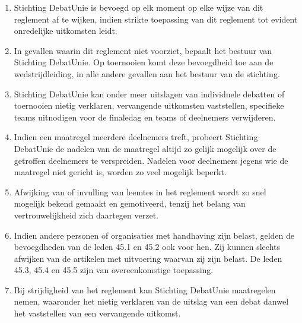 
\begin{enumerate}
\item Stichting DebatUnie is bevoegd op elk moment op elke wijze van dit reglement af te wijken, indien strikte toepassing van dit reglement tot evident onredelijke uitkomsten leidt.
\item In gevallen waarin dit reglement niet voorziet, bepaalt het bestuur van Stichting DebatUnie. Op toernooien komt deze bevoegdheid toe aan de wedstrijdleiding, in alle andere gevallen aan het bestuur van de stichting. 
\item Stichting DebatUnie kan onder meer uitslagen van individuele debatten of toernooien nietig verklaren, vervangende uitkomsten vaststellen, specifieke teams uitnodigen voor de finaledag en teams of deelnemers verwijderen.
\item Indien een maatregel meerdere deelnemers treft, probeert Stichting DebatUnie de nadelen van de maatregel altijd zo gelijk mogelijk over de getroffen deelnemers te verspreiden. Nadelen voor deelnemers jegens wie de maatregel niet gericht is, worden zo veel mogelijk beperkt.
\item Afwijking van of invulling van leemtes in het reglement wordt zo snel mogelijk bekend gemaakt en gemotiveerd, tenzij het belang van vertrouwelijkheid zich daartegen verzet.
\item Indien andere personen of organisaties met handhaving zijn belast, gelden de bevoegdheden van de leden 45.1 en 45.2 ook voor hen. Zij kunnen slechts afwijken van de artikelen met uitvoering waarvan zij zijn belast. De leden 45.3, 45.4 en 45.5 zijn van overeenkomstige toepassing.
\item Bij strijdigheid van het reglement kan Stichting DebatUnie maatregelen nemen, waaronder het nietig verklaren van de uitslag van een debat danwel het vaststellen van een vervangende uitkomst.
\end{enumerate}
